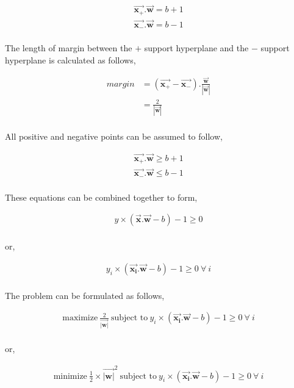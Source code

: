 \documentclass[11pt, a4paper]{article}
\begin{document}
\begin{align*}
	\vec{\mathbf{x_{+}}}.\vec{\mathbf{w}} = b + 1 \\
	\vec{\mathbf{x_{-}}}.\vec{\mathbf{w}} = b - 1 \\
\end{align*}

The length of margin between the $+$ support hyperplane and the $-$ support hyperplane is calculated as follows, 

\begin{align*}
	margin & = (\vec{\mathbf{x_{+}}} - \vec{\mathbf{x_{-}}}) . \frac{\vec{\mathbf{w}}}{|\vec{\mathbf{w}}|} \\
	       & = \frac{2}{|\vec{\mathbf{w}}|}                                                                \\    
\end{align*}

All positive and negative points can be assumed to follow, 

\begin{align*}
	\vec{\mathbf{x_{+}}}.\vec{\mathbf{w}} \geq b + 1 \\
	\vec{\mathbf{x_{-}}}.\vec{\mathbf{w}} \leq b - 1 \\    
\end{align*}

These equations can be combined together to form,

\begin{align*}
	y \times (\vec{\mathbf{x}}.\vec{\mathbf{w}} - b) - 1 \geq 0 \\
\end{align*}

or, 

\begin{align*}
	y_i \times (\vec{\mathbf{x_i}}.\vec{\mathbf{w}} - b) - 1 \geq 0\ \forall\ i \\
\end{align*}

The problem can be formulated as follows,

\begin{align*}
	\text{maximize}\ \frac{2}{\vec{\mathbf{|w|}}}\ \text{subject to}\           
	y_i \times (\vec{\mathbf{x_i}}.\vec{\mathbf{w}} - b) - 1 \geq 0\ \forall\ i \\
\end{align*}

or, 

\begin{align*}
	\text{minimize}\ \frac{1}{2} \times {\vec{\mathbf{|w|}}^2}\ \text{subject to}\ 
	y_i \times (\vec{\mathbf{x_i}}.\vec{\mathbf{w}} - b) - 1 \geq 0\ \forall\ i    \\
\end{align*}
\end{document}
